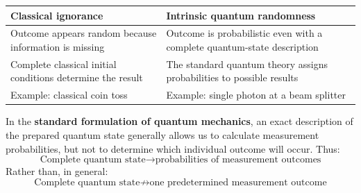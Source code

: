 \highspace
\begin{center}
    \begin{tabular}{@{} p{14em} p{19em} @{}}
        \toprule
        \textbf{Classical ignorance}    & \textbf{Intrinsic quantum randomness} \\
        \midrule
        Outcome appears random because information is missing       & Outcome is probabilistic even with a complete quantum-state description   \\[.3em]
        Complete classical initial conditions determine the result  & The standard quantum theory assigns probabilities to possible results     \\[.3em]
        Example: classical coin toss                                & Example: single photon at a beam splitter                                 \\
        \bottomrule
    \end{tabular}
\end{center}

\highspace
In the \textbf{standard formulation of quantum mechanics}, an exact description of the prepared quantum state generally allows us to calculate measurement probabilities, but not to determine which individual outcome will occur. Thus:
\begin{equation*}
    \text{Complete quantum state}
    \longrightarrow
    \text{probabilities of measurement outcomes}
\end{equation*}
Rather than, in general:
\begin{equation*}
    \text{Complete quantum state}
    \not\longrightarrow
    \text{one predetermined measurement outcome}
\end{equation*}

